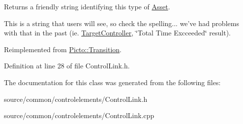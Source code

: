 Returns a friendly string identifying this type of \hyperlink{class_picto_1_1_asset}{Asset}. 

This is a string that users will see, so check the spelling... we've had problems with that in the past (ie. \hyperlink{class_picto_1_1_target_controller}{Target\-Controller}, \char`\"{}\-Total Time Excceeded\char`\"{} result). 

Reimplemented from \hyperlink{class_picto_1_1_transition_a186f341ac2591346ca6a343ecc61c920}{Picto\-::\-Transition}.



Definition at line 28 of file Control\-Link.\-h.



The documentation for this class was generated from the following files\-:\begin{DoxyCompactItemize}
\item 
source/common/controlelements/Control\-Link.\-h\item 
source/common/controlelements/Control\-Link.\-cpp\end{DoxyCompactItemize}
